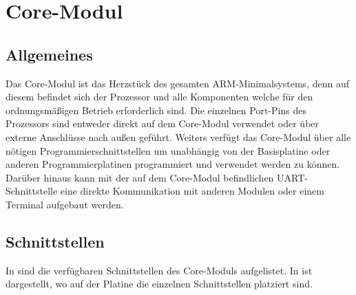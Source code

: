 \section{Core-Modul}
\label{sec:coremodul}


\subsection{Allgemeines}
\label{sec:coremodul-allgemeines}

Das \gls{Core-Modul} ist das Herzstück des gesamten \gls{ARM}-\gls{Minimalsystem}s, denn auf diesem befindet sich der Prozessor und alle Komponenten welche für den ordnungsmäßigen Betrieb erforderlich sind. Die einzelnen Port-Pins des Prozessors sind entweder direkt auf dem \gls{Core-Modul} verwendet oder über externe Anschlüsse nach außen geführt. Weiters verfügt das \gls{Core-Modul} über alle nötigen Programmierschnittstellen um unabhängig von der \gls{Basisplatine} oder anderen Programmierplatinen programmiert und verwendet werden zu können. Darüber hinaus kann mit der auf dem \gls{Core-Modul} befindlichen UART-Schnittstelle eine direkte Kommunikation mit anderen Modulen oder einem Terminal aufgebaut werden.

\subsection{Schnittstellen}
\label{sec:coremodul-schnittstellen}

In  sind die verfügbaren Schnittstellen des \gls{Core-Modul}s aufgelistet. In  ist dargestellt, wo auf der Platine die einzelnen Schnittstellen platziert sind.


